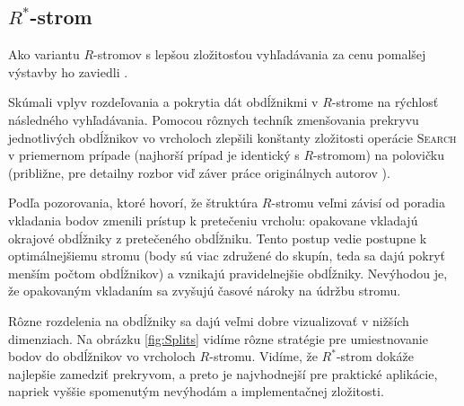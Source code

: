 \documentclass[12pt,a4paper,oneside]{article}
\begin{document}
{\subsection{$R^*$-strom}\label{rstartree}

\FloatBarrier

Ako variantu $R$-stromov s lepšou zložitosťou vyhľadávania za cenu pomalšej výstavby ho zaviedli \citet{Beckmann90}.

Skúmali vplyv rozdeľovania a pokrytia dát obdĺžnikmi v $R$-strome na rýchlosť následného vyhľadávania. Pomocou rôznych techník zmenšovania prekryvu jednotlivých obdĺžnikov vo vrcholoch zlepšili konštanty zložitosti operácie \textsc{Search} v priemernom prípade (najhorší prípad je identický s $R$-stromom) na polovičku (približne, pre detailny rozbor viď záver práce originálnych autorov \citet{Beckmann90}).

Podľa pozorovania, ktoré hovorí, že štruktúra $R$-stromu veľmi závisí od poradia vkladania bodov zmenili prístup k pretečeniu vrcholu:
opakovane vkladajú okrajové obdĺžniky z pretečeného obdĺžniku.
Tento postup vedie postupne k optimálnejšiemu stromu (body sú viac združené do skupín, teda sa dajú pokryť menším počtom obdĺžnikov) a vznikajú pravidelnejšie obdĺžniky.
Nevýhodou je, že opakovaným vkladaním sa zvyšujú časové nároky na údržbu stromu.

Rôzne rozdelenia na obdĺžniky sa dajú veľmi dobre vizualizovať v nižších dimenziach. Na obrázku \ref{fig:Splits} vidíme rôzne stratégie pre umiestnovanie bodov do obdĺžnikov vo vrcholoch $R$-stromu. Vidíme, že $R^*$-strom dokáže najlepšie zamedziť prekryvom, a preto je najvhodnejší pre praktické aplikácie, napriek vyššie spomenutým nevýhodám a implementačnej zložitosti.

}
\end{document}
